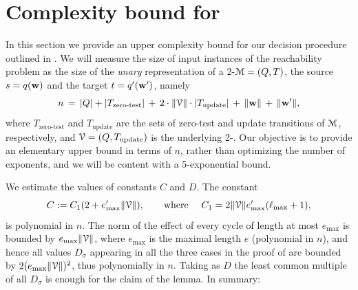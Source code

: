 
\section{Complexity bound for } \label{sec:complexity}


In this section we provide an upper complexity bound for our decision procedure
outlined in .
We will measure the size of input instances of the reachability problem 
as the size of the \emph{unary}
representation of a 2-\cm $\mathcal{M}=(Q,T)$, the source $s=q(\mathbf{w})$ 
and the target $t=q'(\mathbf{w}')$, namely
\[
n \, = \,
|Q| + |T_\text{zero-test}| \, + \, 
2 \cdot \lVert\mathcal{V}\rVert \cdot |T_\text{update}|
\, + \, \lVert\mathbf{w}\rVert \, + \, \lVert\mathbf{w}'\rVert,
\]
where $T_\text{zero-test}$ and $T_\text{update}$ are the sets of zero-test
and update transitions of $\mathcal{M}$, respectively, and 
$\mathcal{V}=(Q,T_\text{update})$ is the underlying 2-\vass.
Our objective is to provide an elementary upper bound
in terms of $n$, rather than
optimizing the number of exponents, 
and we will be content with a 5-exponential bound.



We estimate the values of constants $C$ and 
$D$.
The constant 
\[
    C := C_1 (2 + e'_\mathrm{max}\lVert\mathcal{V}\rVert), 
    \qquad \text{where } \quad
    C_1 = 2\lVert\mathcal{V}\rVert e'_\mathrm{max} (\ell_\mathrm{max} + 1),
\]
is polynomial in $n$.
The norm of the effect of every cycle of length at most $e_\text{max}$ 
is bounded by $e_\text{max}\lVert\mathcal{V}\rVert$,
where $e_\mathrm{max}$ is the maximal length $e$ (polynomial in $n$),
and hence
all values $D_\sigma$ appearing in all the three cases
in the proof of  
are bounded by $2(e_\text{max} \lVert\mathcal{V}\rVert)^2$, thus
polynomially in $n$.
Taking as $D$ the least common multiple of all $D_\sigma$ is enough for the
claim of the lemma.
In summary:

